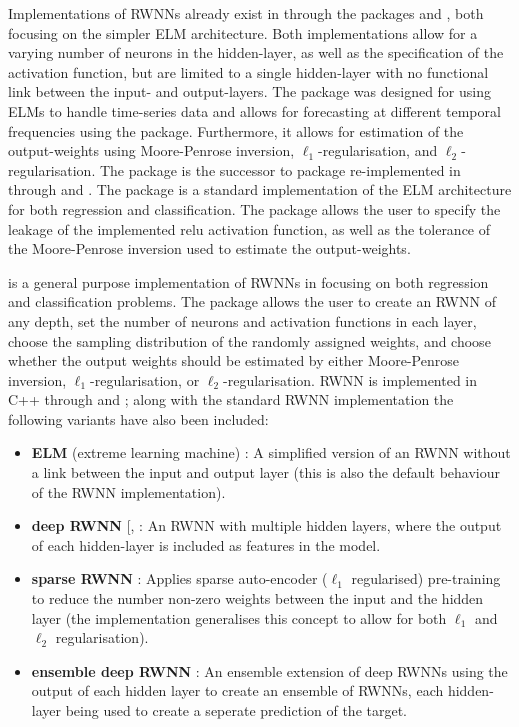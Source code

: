 \documentclass[
]{jss}
\providecommand{\tightlist}{%
  \setlength{\itemsep}{0pt}\setlength{\parskip}{0pt}}
\begin{document}
Implementations of RWNNs already exist in  through the
packages  \citep{nnfor} and 
\citep{elmNNRcpp}, both focusing on the simpler ELM architecture. Both
implementations allow for a varying number of neurons in the
hidden-layer, as well as the specification of the activation function,
but are limited to a single hidden-layer with no functional link between
the input- and output-layers. The  package was designed for
using ELMs to handle time-series data and allows for forecasting at
different temporal frequencies using the  package.
Furthermore, it allows for estimation of the output-weights using
Moore-Penrose inversion, \(\ell_1\)-regularisation, and
\(\ell_2\)-regularisation. The  package is the successor
to  package \citep{elmNN} re-implemented in 
through  and  \citep[\citet{RcppA}]{Rcpp}.
The package is a standard implementation of the ELM architecture for
both regression and classification. The package allows the user to
specify the leakage of the implemented relu activation function, as well
as the tolerance of the Moore-Penrose inversion used to estimate the
output-weights.

 is a general purpose implementation of RWNNs in 
\citep{R} focusing on both regression and classification problems. The
 package allows the user to create an RWNN of any depth, set
the number of neurons and activation functions in each layer, choose the
sampling distribution of the randomly assigned weights, and choose
whether the output weights should be estimated by either Moore-Penrose
inversion, \(\ell_1\)-regularisation, or \(\ell_2\)-regularisation. RWNN
is implemented in C++ through  and ; along
with the standard RWNN implementation the following variants have also
been included:

\begin{itemize}
\tightlist
\item
  \textbf{ELM} (extreme learning machine) \citep{Huang2006}: A
  simplified version of an RWNN without a link between the input and
  output layer (this is also the default behaviour of the RWNN
  implementation).
\item
  \textbf{deep RWNN} {[}\citet{Henriquez2018}, \citep{Shi2021}: An RWNN
  with multiple hidden layers, where the output of each hidden-layer is
  included as features in the model.
\item
  \textbf{sparse RWNN} \citep{Zhang2019}: Applies sparse auto-encoder
  (\(\ell_1\) regularised) pre-training to reduce the number non-zero
  weights between the input and the hidden layer (the implementation
  generalises this concept to allow for both \(\ell_1\) and \(\ell_2\)
  regularisation).
\item
  \textbf{ensemble deep RWNN} \citep{Shi2021}: An ensemble extension of
  deep RWNNs using the output of each hidden layer to create an ensemble
  of RWNNs, each hidden-layer being used to create a seperate prediction
  of the target.
\end{itemize}
\end{document}
